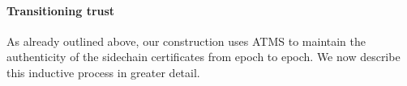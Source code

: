 



\paragraph{Transitioning trust}
\label{sec:trust}

As already outlined above, our construction uses ATMS
to maintain the authenticity of the sidechain certificates from epoch to epoch.
We now describe this inductive process in greater detail.

